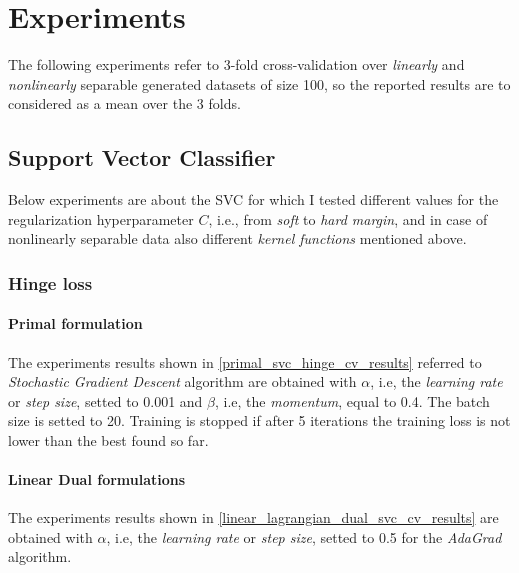 \section{Experiments}

The following experiments refer to 3-fold cross-validation over \emph{linearly} and \emph{nonlinearly} separable generated datasets of size 100, so the reported results are to considered as a mean over the 3 folds.

\subsection{Support Vector Classifier}

Below experiments are about the SVC for which I tested different values for the regularization hyperparameter $C$, i.e., from \emph{soft} to \emph{hard margin}, and in case of nonlinearly separable data also different \emph{kernel functions} mentioned above.

\subsubsection{Hinge loss}

\paragraph{Primal formulation}

The experiments results shown in \ref{primal_svc_hinge_cv_results} referred to \emph{Stochastic Gradient Descent} algorithm are obtained with $\alpha$, i.e, the \emph{learning rate} or \emph{step size}, setted to 0.001 and $\beta$, i.e, the \emph{momentum}, equal to 0.4. The batch size is setted to 20. Training is stopped if after 5 iterations the training loss is not lower than the best found so far.



\paragraph{Linear Dual formulations}

The experiments results shown in \ref{linear_lagrangian_dual_svc_cv_results} are obtained with $\alpha$, i.e, the \emph{learning rate} or \emph{step size}, setted to 0.5 for the \emph{AdaGrad} algorithm.





